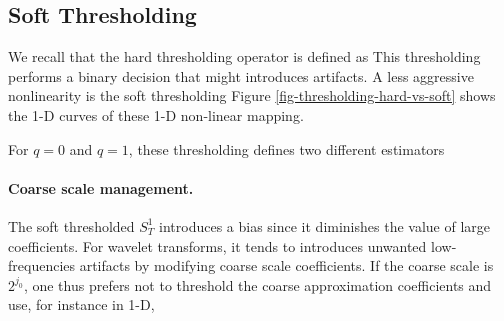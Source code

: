 

\subsection{Soft Thresholding}

We recall that the hard thresholding operator is defined as
This thresholding performs a binary decision that might introduces artifacts. A less aggressive nonlinearity is the soft thresholding
Figure \ref{fig-thresholding-hard-vs-soft} shows the 1-D curves of these 1-D non-linear mapping.


For $q=0$ and $q=1$, these thresholding defines two different estimators



\paragraph{Coarse scale management.}

The soft thresholded $S_T^1$ introduces a bias since it diminishes the value of large coefficients. 
For wavelet transforms, it tends to introduces unwanted low-frequencies artifacts by modifying coarse scale coefficients. If the coarse scale is $2^{j_0}$, one thus prefers not to threshold the coarse approximation coefficients and use, for instance in 1-D,

